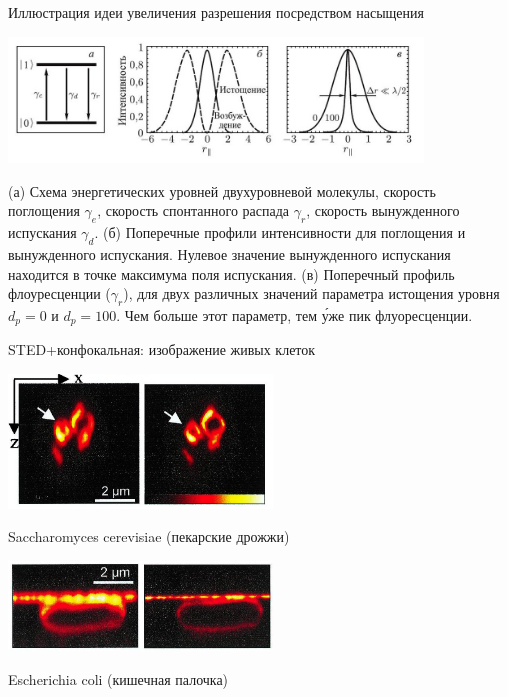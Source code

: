 \documentclass[9pt, compress, xcolor=table]{beamer}
\begin{document}
\begin{frame}{Иллюстрация идеи увеличения разрешения посредством насыщения}

\begin{center}
\includegraphics[width=11cm]{fig4_07f}
\end{center}

\scriptsize{(а) Схема энергетических уровней двухуровневой молекулы, скорость поглощения $\gamma_e$,
скорость спонтанного распада $\gamma_r$, скорость вынужденного испускания $\gamma_d$. (б)
Поперечные профили интенсивности для поглощения и вынужденного испускания. Нулевое значение
вынужденного испускания находится в точке максимума поля испускания. (в) Поперечный профиль
флоуресценции ($\gamma_r$), для двух различных значений параметра истощения уровня $d_p = 0$ и $d_p
= 100$. Чем больше этот параметр, тем \'{у}же пик флуоресценции.}
\end{frame}


\begin{frame}{STED+конфокальная: изображение живых клеток}

\begin{center}
\includegraphics[width=7cm]{fig4_07g}
\end{center}

Saccharomyces cerevisiae (пекарские дрожжи)

\begin{center}
\includegraphics[width=7cm]{fig4_07h}
\end{center}

Escherichia coli (кишечная палочка)

\end{frame}
\end{document}
